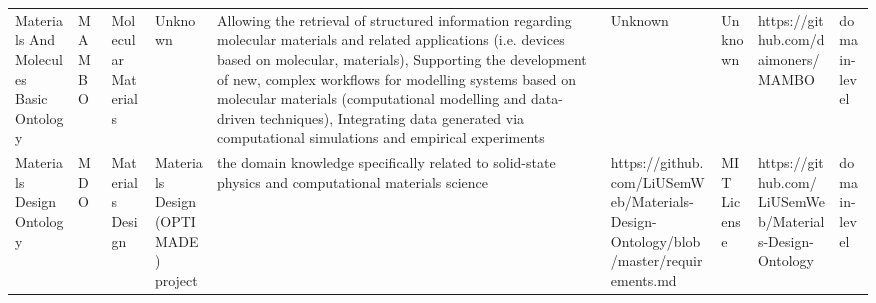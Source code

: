 \begin{tabular}{m{5cm}m{2cm}m{5cm}m{2cm}m{2cm}m{2cm}m{2cm}m{2cm}m{2cm}}
                                           Materials And Molecules Basic Ontology &                   MAMBO &                         Molecular Materials &                                                                                                                                                                                                                                                                                                                                                              Unknown & Allowing the retrieval of structured information regarding molecular materials and related applications (i.e. devices based on molecular, materials), Supporting the development of new, complex workflows for modelling systems based on molecular materials (computational modelling and data-driven techniques), Integrating data generated via computational simulations and empirical experiments &                                                                                                            Unknown &                                      Unknown &                                                                https://github.com/daimoners/MAMBO  &      domain-level \\
                                                        Materials Design Ontology &                     MDO &                            Materials Design &                                                                                                                                                                                                                                                                                                                                  Materials Design (OPTIMADE) project &                                                                                                                                                                                                                                                                                                   the domain knowledge specifically related to solid-state physics and computational materials science &                                 https://github.com/LiUSemWeb/Materials-Design-Ontology/blob/master/requirements.md &                                  MIT License &                                            https://github.com/LiUSemWeb/Materials-Design-Ontology  &      domain-level \\

\end{tabular}
